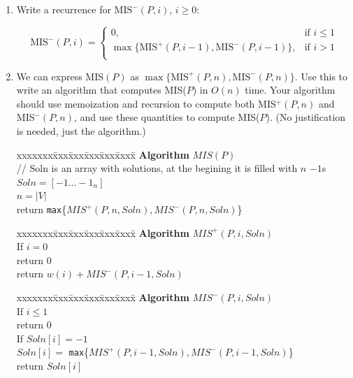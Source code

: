 \documentclass[11pt]{article}
\def\question#1{\red{#1}}
\def\soln#1{\par\blu{#1}} %
\def\blu#1{{\color{blu}#1}}
\def\red#1{{\color{red}#1}}
\begin{document}
\begin{enumerate}
\item \question{Write a recurrence for $\mbox{MIS}^-(P,i)$, $i\ge 0$:}
\soln{
\[
   \mbox{MIS}^-(P,i) = \left \{\begin{array}{ll}
                   0, & \mbox{if } i \leq 1 \\[.3in]
                   \max \{ \mbox{MIS}^+(P,i-1) , \mbox{MIS}^-(P,i-1) \}, & \mbox{if } i > 1 \\
                   \end{array} \right.
   \]
   }
\item 
We can express MIS$(P)$ as $\max \{\mbox{MIS}^+(P,n), \mbox{MIS}^-(P,n) \}$. 
\question{Use this to write an algorithm that computes MIS($P$) in $O(n)$ time.}  
Your algorithm should use memoization and recursion to compute both
MIS$^+(P,n)$ and MIS$^-(P,n)$, and use these quantities to compute
MIS($P$). (No justification is needed, just the algorithm.)
\soln{
  \begin{tabbing}
  xxxxxxx\=xxx\=xxx\=xxx\=xxx\=xxxx\= \kill
  \> {\bf Algorithm} $MIS(P)$ \\
  \>\> // Soln is an array with solutions, at the begining it is filled with $n$ $-1$s \\
  \>\> $Soln = [-1...-1_n]$ \\
  \>\> $n = |V|$ \\
  \>\> return \texttt{max}\{$MIS^+(P,n,Soln),MIS^-(P,n,Soln)$\} \\
  \end{tabbing}
  \begin{tabbing}
  xxxxxxx\=xxx\=xxx\=xxx\=xxx\=xxxx\= \kill
  \> {\bf Algorithm} $MIS^+(P,i,Soln)$ \\
  \>\> If $i = 0$ \\
  \>\>\> return $0$ \\
  \>\> return $w(i) + MIS^-(P,i-1,Soln)$ \\
  \end{tabbing}
  \begin{tabbing}
  xxxxxxx\=xxx\=xxx\=xxx\=xxx\=xxxx\= \kill
  \> {\bf Algorithm} $MIS^-(P,i,Soln)$ \\
  \>\> If $i \leq 1$ \\
  \>\>\> return $0$ \\
  \>\> If $Soln[i] = -1$ \\
  \>\>\> $Soln[i] = $ \texttt{max}\{$MIS^+(P,i-1,Soln),MIS^-(P,i-1,Soln)$\} \\
  \>\> return $Soln[i]$ \\
  \end{tabbing}
}


\end{enumerate}
\end{document}
